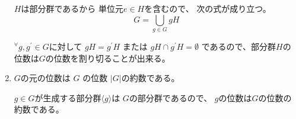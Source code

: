 \documentclass[12pt,b5paper]{ltjsarticle}
\begin{document}
\begin{enumerate}
      $H$は部分群であるから
      単位元$e\in H$を含むので、
      次の式が成り立つ。
      \begin{equation}
       G = \bigcup_{g\in G} gH
      \end{equation}

      ${}^{\forall}g,g^{\prime}\in G$に対して
      $gH=g^{\prime}H$ または $gH \cap g^{\prime}H = \emptyset$
      であるので、部分群$H$の位数は$G$の位数を割り切ることが出来る。


      \hrulefill

 \item
      $G$の元の位数は
      $G$ の位数 $\lvert G \rvert$の約数である。

      \dotfill

      $g\in G$が生成する部分群$\langle g \rangle$は
      $G$の部分群であるので、
      $g$の位数は$G$の位数の約数である。

      \hrulefill

\end{enumerate}


\hrulefill
\end{document}
